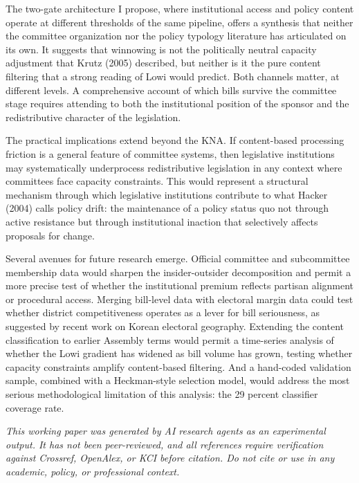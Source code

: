 \documentclass[11pt]{article}
\begin{document}
The two-gate architecture I propose, where institutional access and policy content operate at different thresholds of the same pipeline, offers a synthesis that neither the committee organization nor the policy typology literature has articulated on its own. It suggests that winnowing is not the politically neutral capacity adjustment that Krutz (2005) described, but neither is it the pure content filtering that a strong reading of Lowi would predict. Both channels matter, at different levels. A comprehensive account of which bills survive the committee stage requires attending to both the institutional position of the sponsor and the redistributive character of the legislation.

The practical implications extend beyond the KNA. If content-based processing friction is a general feature of committee systems, then legislative institutions may systematically underprocess redistributive legislation in any context where committees face capacity constraints. This would represent a structural mechanism through which legislative institutions contribute to what Hacker (2004) calls policy drift: the maintenance of a policy status quo not through active resistance but through institutional inaction that selectively affects proposals for change.

Several avenues for future research emerge. Official committee and subcommittee membership data would sharpen the insider-outsider decomposition and permit a more precise test of whether the institutional premium reflects partisan alignment or procedural access. Merging bill-level data with electoral margin data could test whether district competitiveness operates as a lever for bill seriousness, as suggested by recent work on Korean electoral geography. Extending the content classification to earlier Assembly terms would permit a time-series analysis of whether the Lowi gradient has widened as bill volume has grown, testing whether capacity constraints amplify content-based filtering. And a hand-coded validation sample, combined with a Heckman-style selection model, would address the most serious methodological limitation of this analysis: the 29 percent classifier coverage rate.

\bigskip
\noindent\textit{This working paper was generated by AI research agents as an
experimental output. It has not been peer-reviewed, and all references
require verification against Crossref, OpenAlex, or KCI before citation.
Do not cite or use in any academic, policy, or professional context.}
\end{document}
